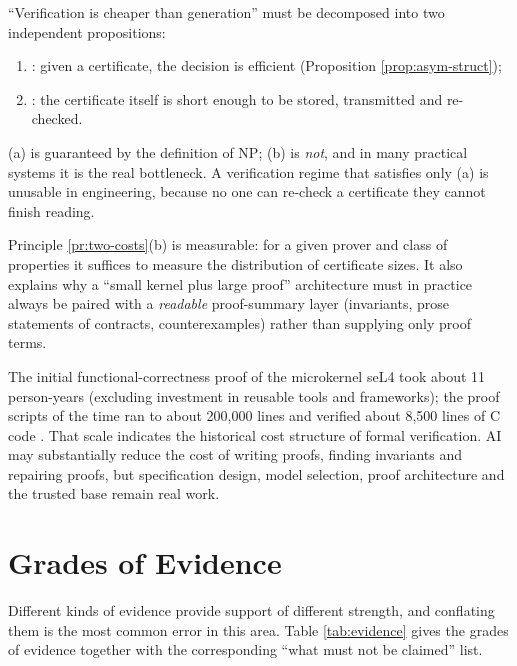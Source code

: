 \begin{principle}\label{pr:two-costs}
``Verification is cheaper than generation'' must be decomposed into two independent
propositions:
\begin{enumerate}[label=(\alph*)]
\item {}: given a certificate, the decision is efficient
      (Proposition \ref{prop:asym-struct});
\item {}: the certificate itself is short enough to be
      stored, transmitted and re-checked.
\end{enumerate}
(a) is guaranteed by the definition of $\mathrm{NP}$; (b) is \emph{not}, and in many
practical systems it is the real bottleneck. A verification regime that satisfies only (a)
is unusable in engineering, because no one can re-check a certificate they cannot finish
reading.
\end{principle}

Principle \ref{pr:two-costs}(b) is measurable: for a given prover and class of properties it
suffices to measure the distribution of certificate sizes. It also explains why a ``small
kernel plus large proof'' architecture must in practice always be paired with a
\emph{readable} proof-summary layer (invariants, prose statements of contracts,
counterexamples) rather than supplying only proof terms.

\begin{example}\label{ex:sel4-cost}
The initial functional-correctness proof of the microkernel seL4 took about 11 person-years
(excluding investment in reusable tools and frameworks); the proof scripts of the time ran
to about 200{,}000 lines and verified about 8{,}500 lines of C code \cite{klein2009}. That
scale indicates the historical cost structure of formal verification. AI may substantially
reduce the cost of writing proofs, finding invariants and repairing proofs, but
specification design, model selection, proof architecture and the trusted base remain real
work.
\end{example}

\section{Grades of Evidence}\label{sec:evidence-levels}

Different kinds of evidence provide support of different strength, and conflating them is
the most common error in this area. Table \ref{tab:evidence} gives the grades of evidence
together with the corresponding ``what must not be claimed'' list.

